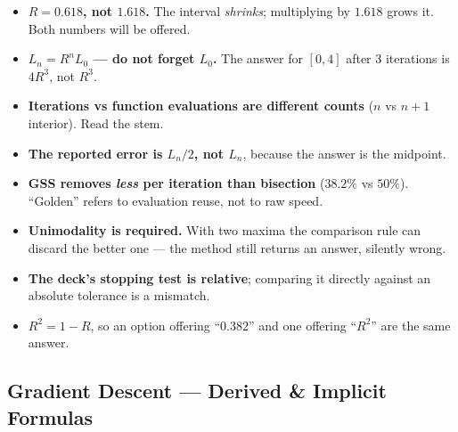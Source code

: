 \begin{trapbox}
\begin{itemize}
\item \textbf{$R = 0.618$, not $1.618$.} The interval \emph{shrinks}; multiplying by $1.618$ grows it. Both numbers will be offered.
\item \textbf{$L_n = R^nL_0$ --- do not forget $L_0$.} The answer for $[0,4]$ after 3 iterations is $4R^3$, not $R^3$.
\item \textbf{Iterations vs function evaluations are different counts} ($n$ vs $n+1$ interior). Read the stem.
\item \textbf{The reported error is $L_n/2$, not $L_n$}, because the answer is the midpoint.
\item \textbf{GSS removes \emph{less} per iteration than bisection} ($38.2\%$ vs $50\%$). ``Golden'' refers to evaluation reuse, not to raw speed.
\item \textbf{Unimodality is required.} With two maxima the comparison rule can discard the better one --- the method still returns an answer, silently wrong.
\item \textbf{The deck's stopping test is relative}; comparing it directly against an absolute tolerance is a mismatch.
\item \textbf{$R^2 = 1-R$}, so an option offering ``$0.382$'' and one offering ``$R^2$'' are the same answer.
\end{itemize}
\end{trapbox}

\subsection{Gradient Descent --- Derived \& Implicit Formulas}

